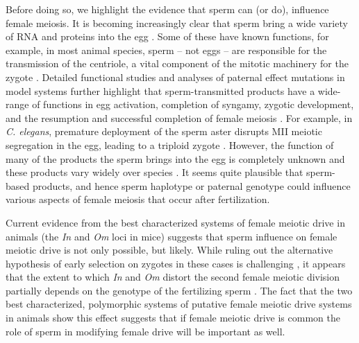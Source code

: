 \documentclass[12pt,letterpaper]{article}
\begin{document}
Before doing so, we highlight the evidence that sperm can (or do), influence female meiosis. 
It is becoming increasingly clear that sperm bring a wide variety of RNA and proteins into the egg \citep{Miller:05}. 
 Some of these have known functions, for example, in most
        animal species, sperm -- not eggs -- are
        responsible for the transmission of the centriole, a vital
        component of the mitotic machinery for the zygote \citep{Schatten:94}. 
Detailed functional studies and analyses of paternal effect mutations in model
systems further highlight that sperm-transmitted products have a wide-range of functions in
 egg activation, completion of syngamy, zygotic development, and the resumption
 and successful completion of
 female meiosis \cite[e.g.][]{Yasuda:95,Loppin:05,Miller:01, McNally:05,Churchill:03}. 
 For example, in \emph{C. elegans}, premature deployment of the sperm aster 
	disrupts MII meiotic segregation in the egg, leading to a triploid zygote \citep{McNally2012}.
However, the function of many of the products the sperm brings into the
        egg is completely unknown and 
      these products vary widely over species \citep{Karrbook:09}. 
It seems quite plausible that sperm-based products, and
	hence sperm haplotype or paternal genotype could influence 
	various aspects of female meiosis that occur after fertilization. 
\newline



Current evidence from the best characterized systems of female meiotic drive in animals 
	(the  \emph{In} and \emph{Om} loci in mice) 
	suggests that sperm influence on female meiotic drive is not only possible, but likely. 
 While ruling out the alternative hypothesis of early selection on zygotes in these cases is challenging  \citep[see pages 52-54 in][ for comment]{Burt2006}, it appears that the extent to which \emph{In} and \emph{Om} distort the second female meiotic division partially depends on the 	
	genotype of the fertilizing sperm \citep{Agulnik1993,Wu2005}. 
The fact that the two best characterized, polymorphic systems of putative female 
	meiotic drive systems in animals 
	show this effect suggests that if female meiotic drive is common 
	the role of sperm in modifying female drive will be important as well.  \newline
\end{document}
